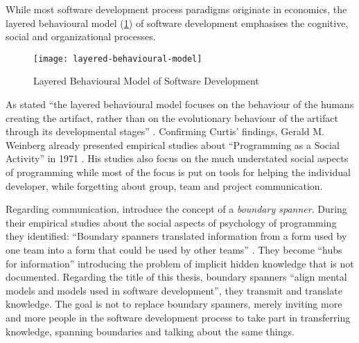 While most software development process paradigms originate in economics, the layered behavioural model (\cref{fig:layered-behavioural-model}) of software development \autocite{curtis_psychology_1990} emphasises the cognitive, social and organizational processes.
\begin{figure}[h]
\centering
\texttt{[image: layered-behavioural-model]}
\caption{Layered Behavioural Model of Software Development}
\label{fig:layered-behavioural-model}
\end{figure}
As stated ``the layered behavioural model focuses on the behaviour of the humans creating the artifact, rather than on the evolutionary behaviour of the artifact through its developmental stages'' \autocite[254]{curtis_psychology_1990}.
Confirming Curtis' findings, Gerald M. Weinberg already presented empirical studies about ``Programming as a Social Activity'' in 1971 \autocite{weinberg_psychology_1971}.
His studies also focus on the much understated social aspects of programming while most of the focus is put on tools for helping the individual developer, while forgetting about group, team and project communication.

Regarding communication, \textcite{curtis_psychology_1990} introduce the concept of a \emph{boundary spanner}.
During their empirical studies about the social aspects of psychology of programming they identified: ``Boundary spanners translated information from a form used by one team into a form that could be used by other teams'' \autocite[264]{curtis_psychology_1990}.
They become ``hubs for information'' \autocite[264]{curtis_psychology_1990} introducing the problem of implicit hidden knowledge that is not documented.
Regarding the title of this thesis, boundary spanners ``align mental models and models used in software development'', they transmit and translate knowledge.
The goal is not to replace boundary spanners, merely inviting more and more people in the software development process to take part in transferring knowledge, spanning boundaries and talking about the same things.


